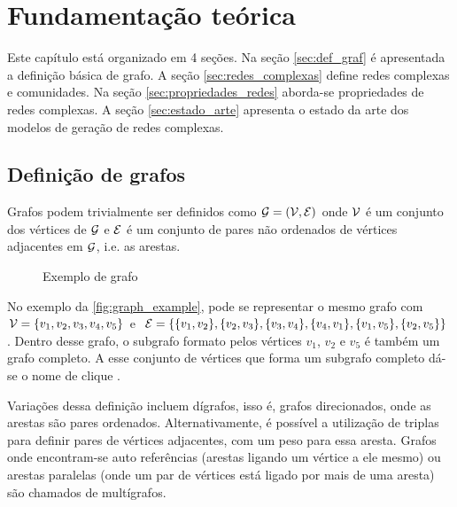 \documentclass[notes.tex]{subfiles}
\begin{document}
\chapter{Fundamentação teórica}

Este capítulo está organizado em 4 seções.
Na seção \ref{sec:def_graf} é apresentada a definição básica de grafo.
A seção \ref{sec:redes_complexas} define redes complexas e comunidades.
Na seção \ref{sec:propriedades_redes} aborda-se propriedades de redes complexas.
A seção \ref{sec:estado_arte} apresenta o estado da arte dos modelos de geração de redes complexas.

\section{Definição de grafos\label{sec:def_graf}}

Grafos podem trivialmente ser definidos como $\operatorname{\mathcal{G}} = (\operatorname{\mathcal{V}}, \operatorname{\mathcal{E}})$ onde $\operatorname{\mathcal{V}}$ é um conjunto dos vértices de  $\operatorname{\mathcal{G}}$ e  $\operatorname{\mathcal{E}}$ é um conjunto de pares não ordenados de vértices adjacentes em $\operatorname{\mathcal{G}}$, i.e. as arestas.

\begin{figure}[htpb]
    \centering
    \caption{Exemplo de grafo}\label{fig:graph_example}
\end{figure}

No exemplo da \autoref{fig:graph_example}, pode se representar o mesmo grafo com $\operatorname{\mathcal{V}} = \{v_1, v_2, v_3, v_4, v_5\}$ e $\operatorname{\mathcal{E}} = \{\{v_1, v_2\}, \{v_2, v_3\}, \{v_3, v_4\}, \{v_4, v_1\}, \{v_1, v_5\}, \{v_2, v_5\}\}$.
Dentro desse grafo, o subgrafo formato pelos vértices $v_1$, $v_2$ e $v_5$ é também um grafo completo.
A esse conjunto de vértices que forma um subgrafo completo dá-se o nome de clique \cite{fortunato2010community}.

Variações dessa definição incluem dígrafos, isso é, grafos direcionados, onde as arestas são pares ordenados.
Alternativamente, é possível a utilização de triplas para definir pares de vértices adjacentes, com um peso para essa aresta.
Grafos onde encontram-se auto referências (arestas ligando um vértice a ele mesmo) ou arestas paralelas (onde um par de vértices está ligado por mais de uma aresta) são chamados de multígrafos.
\end{document}
